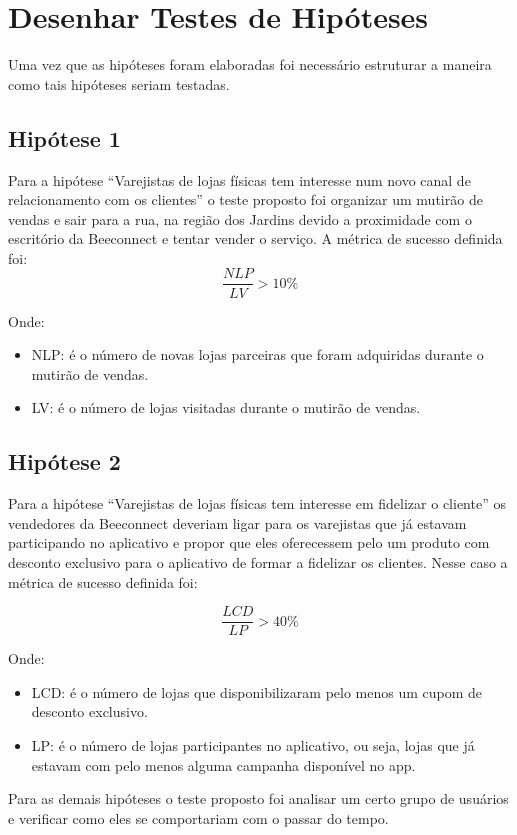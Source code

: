 \section{Desenhar Testes de Hipóteses}
\label{cha:desenhar_hipoteses}
Uma vez que as hipóteses foram elaboradas foi necessário estruturar a maneira como tais hipóteses seriam testadas. 

\subsection{Hipótese 1}
\label{cha:hip_1}
Para a hipótese \enquote{Varejistas de lojas físicas tem interesse num novo canal de relacionamento com os clientes} o teste proposto foi organizar um mutirão de vendas e sair para a rua, na região dos Jardins devido a proximidade com o escritório da Beeconnect e tentar vender o serviço. A métrica de sucesso definida foi:
\[ \dfrac{NLP}{LV} > 10\%\]

Onde: 
\begin{itemize}
\item NLP: é o número de novas lojas parceiras que foram adquiridas durante o mutirão de vendas.
\item LV: é o número de lojas visitadas durante o mutirão de vendas.
\end{itemize}

\subsection{Hipótese 2}
\label{cha:hip_2}
Para a hipótese \enquote{Varejistas de lojas físicas tem interesse em fidelizar o cliente} os vendedores da Beeconnect deveriam ligar para os varejistas que já estavam participando no aplicativo e propor que eles oferecessem pelo um produto com desconto exclusivo para o aplicativo de formar a fidelizar os clientes. Nesse caso a métrica de sucesso definida foi:

\[\dfrac{LCD}{LP} > 40\%\]

Onde: 
\begin{itemize}
\item LCD: é o número de lojas que disponibilizaram pelo menos um cupom de desconto exclusivo.
\item LP: é o número de lojas participantes no aplicativo, ou seja, lojas que já estavam com pelo menos alguma campanha disponível no app.
\end{itemize}

Para as demais hipóteses o teste proposto foi analisar um certo grupo de usuários e verificar como eles se comportariam com o passar do tempo. 


